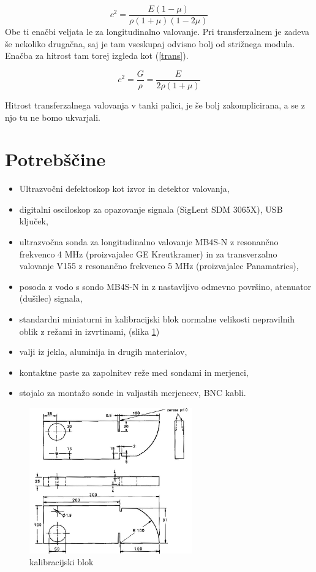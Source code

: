 \documentclass[12pt]{article}
\begin{document}
\begin{equation}
    c^{2} = \frac{E(1-\mu)}{\rho(1+\mu)(1-2\mu)}
    \label{razsežna}
\end{equation}
Obe ti enačbi veljata le za longitudinalno valovanje. Pri transferzalnem je zadeva še nekoliko drugačna, saj je tam vseskupaj odvisno bolj od strižnega modula. Enačba za hitrost tam torej izgleda kot (\ref{trans}).

\begin{equation}
    c^2 = \frac{G}{\rho} = \frac{E}{2\rho(1+\mu)}
    \label{trans}
\end{equation}

Hitrost transferzalnega valovanja v tanki palici, je še bolj zakomplicirana, a se z njo tu ne bomo ukvarjali.

\section{Potrebščine}

\begin{itemize}
    \item Ultrazvočni defektoskop kot izvor in detektor valovanja,
    \item digitalni osciloskop za opazovanje signala (SigLent SDM 3065X), USB ključek,
    \item ultrazvočna sonda za longitudinalno valovanje MB4S-N z resonančno frekvenco 4 MHz (proizvajalec GE Kreutkramer) in za transverzalno valovanje V155 z resonančno frekvenco 5 MHz (proizvajalec Panamatrics),
    \item posoda z vodo s sondo MB4S-N in z nastavljivo odmevno površino, atenuator (dušilec) signala,
    \item standardni miniaturni in kalibracijski blok normalne velikosti nepravilnih oblik z režami in izvrtinami, (slika \ref{blok})
    \item valji iz jekla, aluminija in drugih materialov,
    \item kontaktne paste za zapolnitev reže med sondami in merjenci,
    \item stojalo za montažo sonde in valjastih merjencev, BNC kabli.
\end{itemize}

\begin{figure}[h]
\begin{center}
    \includegraphics[width=7cm]{blok.png}
    \caption{kalibracijski blok}
    \label{blok}
\end{center}
\end{figure}
\end{document}

